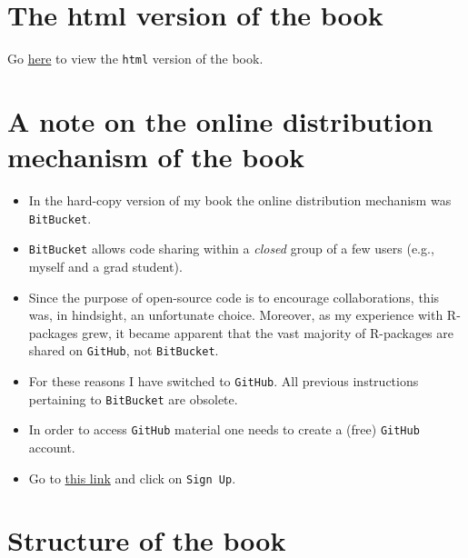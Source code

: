\documentclass[
]{book}
\providecommand{\tightlist}{%
  \setlength{\itemsep}{0pt}\setlength{\parskip}{0pt}}
\begin{document}
\hypertarget{the-html-version-of-the-book}{%
\section*{The html version of the book}\label{the-html-version-of-the-book}}

Go \href{https://dpc10ster.github.io/RJafrocFrocBook/}{here} to view the \texttt{html} version of the book.

\hypertarget{a-note-on-the-online-distribution-mechanism-of-the-book}{%
\section*{A note on the online distribution mechanism of the book}\label{a-note-on-the-online-distribution-mechanism-of-the-book}}

\begin{itemize}
\tightlist
\item
  In the hard-copy version of my book \citep{chakraborty2017observer} the online distribution mechanism was \texttt{BitBucket}.
\item
  \texttt{BitBucket} allows code sharing within a \emph{closed} group of a few users (e.g., myself and a grad student).
\item
  Since the purpose of open-source code is to encourage collaborations, this was, in hindsight, an unfortunate choice. Moreover, as my experience with R-packages grew, it became apparent that the vast majority of R-packages are shared on \texttt{GitHub}, not \texttt{BitBucket}.
\item
  For these reasons I have switched to \texttt{GitHub}. All previous instructions pertaining to \texttt{BitBucket} are obsolete.
\item
  In order to access \texttt{GitHub} material one needs to create a (free) \texttt{GitHub} account.
\item
  Go to \href{https://github.com}{this link} and click on \texttt{Sign\ Up}.
\end{itemize}

\hypertarget{structure-of-the-book}{%
\section*{Structure of the book}\label{structure-of-the-book}}
\end{document}
